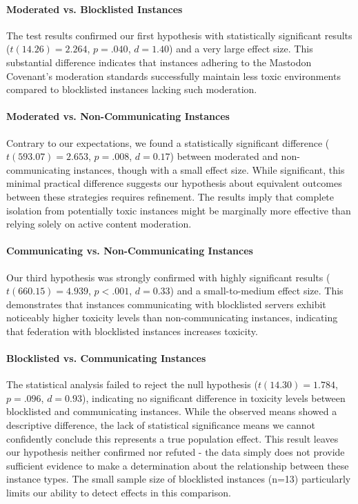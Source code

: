\paragraph{Moderated vs. Blocklisted Instances}
The test results confirmed our first hypothesis with statistically significant results ($t(14.26) = 2.264$, $p = .040$, $d = 1.40$) and a very large effect size. This substantial difference indicates that instances adhering to the Mastodon Covenant's moderation standards successfully maintain less toxic environments compared to blocklisted instances lacking such moderation.

\paragraph{Moderated vs. Non-Communicating Instances}
Contrary to our expectations, we found a statistically significant difference ($t(593.07) = 2.653$, $p = .008$, $d = 0.17$) between moderated and non-communicating instances, though with a small effect size. While significant, this minimal practical difference suggests our hypothesis about equivalent outcomes between these strategies requires refinement. The results imply that complete isolation from potentially toxic instances might be marginally more effective than relying solely on active content moderation.

\paragraph{Communicating vs. Non-Communicating Instances}
Our third hypothesis was strongly confirmed with highly significant results ($t(660.15) = 4.939$, $p < .001$, $d = 0.33$) and a small-to-medium effect size. This demonstrates that instances communicating with blocklisted servers exhibit noticeably higher toxicity levels than non-communicating instances, indicating that federation with blocklisted instances increases toxicity.

\paragraph{Blocklisted vs. Communicating Instances}
The statistical analysis failed to reject the null hypothesis ($t(14.30) = 1.784$, $p = .096$, $d=0.93$), indicating no significant difference in toxicity levels between blocklisted and communicating instances. While the observed means showed a descriptive difference, the lack of statistical significance means we cannot confidently conclude this represents a true population effect. This result leaves our hypothesis neither confirmed nor refuted - the data simply does not provide sufficient evidence to make a determination about the relationship between these instance types. The small sample size of blocklisted instances (n=13) particularly limits our ability to detect effects in this comparison.

